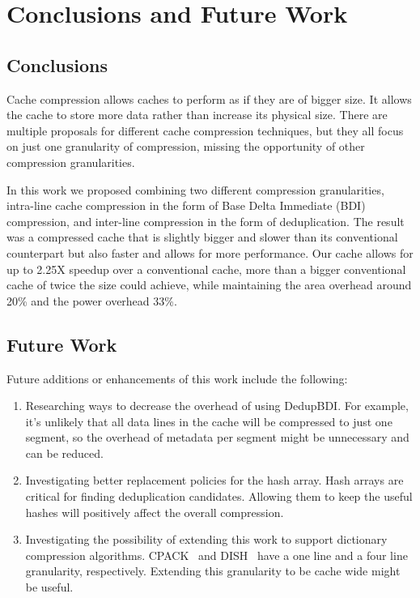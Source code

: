 
\chapter{Conclusions and Future Work}
\label{ch:Conclusions}
\section{Conclusions}
Cache compression allows caches to perform as if they are of bigger size. It allows the cache to store more data rather than increase its physical size. There are multiple proposals for different cache compression techniques, but they all focus on just one granularity of compression, missing the opportunity of other compression granularities.\par
In this work we proposed combining two different compression granularities, intra-line cache compression in the form of Base Delta Immediate (BDI) compression, and inter-line compression in the form of deduplication. The result was a compressed cache that is slightly bigger and slower than its conventional counterpart but also faster and allows for more performance. Our cache allows for up to 2.25X speedup over a conventional cache, more than a bigger conventional cache of twice the size could achieve, while maintaining the area overhead around 20\% and the power overhead 33\%.\par
\section{Future Work}
Future additions or enhancements of this work include the following:
\begin{enumerate}
    \item Researching ways to decrease the overhead of using DedupBDI. For example, it's unlikely that all data lines in the cache will be compressed to just one segment, so the overhead of metadata per segment might be unnecessary and can be reduced.
    \item Investigating better replacement policies for the hash array. Hash arrays are critical for finding deduplication candidates. Allowing them to keep the useful hashes will positively affect the overall compression.
    \item Investigating the possibility of extending this work to support dictionary compression algorithms. CPACK~\cite{cpack} and DISH~\cite{dish} have a one line and a four line granularity, respectively. Extending this granularity to be cache wide might be useful.
\end{enumerate}